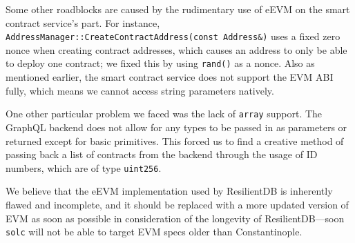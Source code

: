 Some other roadblocks are caused by the rudimentary use of eEVM on the smart contract service’s
part. For instance, \verb|AddressManager::CreateContractAddress(const Address&)| uses a fixed zero
nonce when creating contract addresses, which causes an address to only be able to deploy one
contract; we fixed this by using \verb|rand()| as a nonce. Also as mentioned earlier, the smart
contract service does not support the EVM ABI fully, which means we cannot access string parameters
natively. 

One other particular problem we faced was the lack of \verb|array| support. The GraphQL backend does
not allow for any types to be passed in as parameters or returned except for basic primitives. This
forced us to find a creative method of passing back a list of contracts from the backend through the
usage of ID numbers, which are of type \verb|uint256|.

We believe that the eEVM implementation used by ResilientDB is inherently flawed and incomplete, and it should be replaced with a more updated version of EVM as soon as possible in consideration of the longevity of ResilientDB—soon \verb|solc| will not be able to target EVM specs older than Constantinople.

